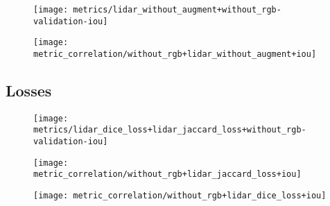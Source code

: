 \begin{figure}[H]
  \centering
  \texttt{[image: metrics/lidar\_without\_augment+without\_rgb-validation-iou]}
\end{figure}

\begin{figure}[H]
  \centering
  \texttt{[image: metric\_correlation/without\_rgb+lidar\_without\_augment+iou]}
\end{figure}

\subsection{Losses}

\begin{figure}[H]
  \centering
  \texttt{[image: metrics/lidar\_dice\_loss+lidar\_jaccard\_loss+without\_rgb-validation-iou]}
\end{figure}

\begin{figure}[H]
  \centering
  \texttt{[image: metric\_correlation/without\_rgb+lidar\_jaccard\_loss+iou]}
\end{figure}

\begin{figure}[H]
  \centering
  \texttt{[image: metric\_correlation/without\_rgb+lidar\_dice\_loss+iou]}
\end{figure}
